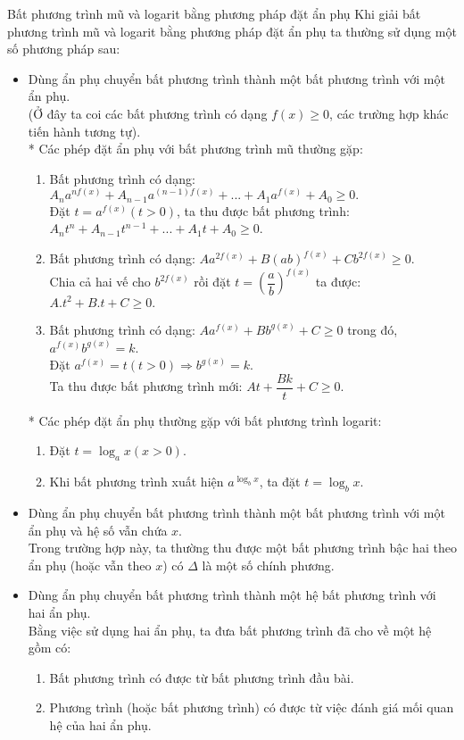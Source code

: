 \begin{dang}{Bất phương trình mũ và logarit bằng phương pháp đặt ẩn phụ}
	Khi giải bất phương trình mũ và logarit bằng phương pháp đặt ẩn phụ ta thường sử dụng một số phương pháp sau:
	\begin{itemize}
		\item Dùng ẩn phụ chuyển bất phương trình thành một bất phương trình với một ẩn phụ.\\
		(Ở đây ta coi các bất phương trình có dạng $f(x) \ge 0$, các trường hợp khác tiến hành tương tự).\\
		* Các phép đặt ẩn phụ với bất phương trình mũ thường gặp:
		\begin{enumerate}[+)]
			\item Bất phương trình có dạng: ${A_n}{a^{nf(x)}} + {A_{n - 1}}{a^{(n - 1)f(x)}} + ... + {A_1}{a^{f(x)}} + {A_0} \ge 0.$\\
			Đặt $t=a^{f(x)} (t>0)$, ta thu được bất phương trình: ${A_n}{t^n} + {A_{n - 1}}{t^{n - 1}} + ... + {A_1}t + {A_0} \ge 0$.
			\item Bất phương trình có dạng: $A{a^{2f(x)}} + B{{(ab)}^{f(x)}} + C{b^{2f(x)}} \ge 0.$\\
			Chia cả hai vế cho $b^{2f(x)}$ rồi đặt $t=\left(\dfrac{a}{b}\right)^{f(x)}$ ta được: $A.t^2+B.t+C\ge 0.$
			\item Bất phương trình có dạng: $A{a^{f(x)}} + B{b}^{g(x)} + C \ge 0$ trong đó, $a^{f(x)}b^{g(x)}=k$.\\
			Đặt $a^{f(x)}=t (t>0) \Rightarrow b^{g(x)}=k$.\\
			Ta thu được bất phương trình mới: $At+\dfrac{Bk}{t}+C \ge 0.$
		\end{enumerate}
		* Các phép đặt ẩn phụ thường gặp với bất phương trình logarit:
		\begin{enumerate}[+)]
			\item Đặt $t=\log_a{x} (x>0)$.
			\item Khi bất phương trình xuất hiện $a^{\log_b{x}}$, ta đặt $t=\log_b{x}$.
		\end{enumerate}
		\item Dùng ẩn phụ chuyển bất phương trình thành một bất phương trình với một ẩn phụ và hệ số vẫn chứa $x$.\\
		Trong trường hợp này, ta thường thu được một bất phương trình bậc hai theo ẩn phụ (hoặc vẫn theo $x$) có $\Delta$ là một số chính phương. 
		\item Dùng ẩn phụ chuyển bất phương trình thành một hệ bất phương trình với hai ẩn phụ.\\
		Bằng việc sử dụng hai ẩn phụ, ta đưa bất phương trình đã cho về một hệ gồm có:
		\begin{enumerate}[+)]
			\item Bất phương trình có được từ bất phương trình đầu bài.
			\item Phương trình (hoặc bất phương trình) có được từ việc đánh giá mối quan hệ của hai ẩn phụ.
		\end{enumerate}
	\end{itemize}
\end{dang}


